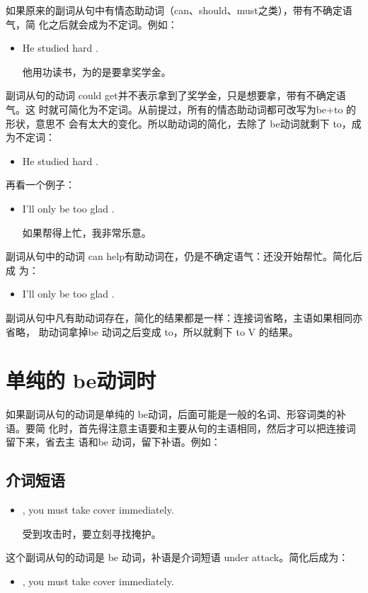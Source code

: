 如果原来的副词从句中有情态助动词（can、should、must之类），带有不确定语气，简
化之后就会成为不定词。例如：
\begin{itemize}
\item He studied hard .

  他用功读书，为的是要拿奖学金。
\end{itemize}
副词从句的动词 could get并不表示拿到了奖学金，只是想要拿，带有不确定语气。这
时就可简化为不定词。从前提过，所有的情态助动词都可改写为be+to 的形状，意思不
会有太大的变化。所以助动词的简化，去除了 be动词就剩下 to，成为不定词：
\begin{itemize}
\item He studied hard .
\end{itemize}

再看一个例子：
\begin{itemize}
\item I'll only be too glad .

  如果帮得上忙，我非常乐意。
\end{itemize}
副词从句中的动词 can help有助动词在，仍是不确定语气：还没开始帮忙。简化后成
为：
\begin{itemize}
\item   I'll only be too glad .
\end{itemize}

副词从句中凡有助动词存在，简化的结果都是一样：连接词省略，主语如果相同亦省略，
助动词拿掉be 动词之后变成 to，所以就剩下 to V 的结果。

\section{单纯的 be动词时}

如果副词从句的动词是单纯的 be动词，后面可能是一般的名词、形容词类的补语。要简
化时，首先得注意主语要和主要从句的主语相同，然后才可以把连接词留下来，省去主
语和be 动词，留下补语。例如：

\subsection{介词短语}

\begin{itemize}
\item {}, you must take cover immediately.

  受到攻击时，要立刻寻找掩护。
\end{itemize}
这个副词从句的动词是 be 动词，补语是介词短语 under attack。简化后成为：
\begin{itemize}
\item {}, you must take cover immediately.
\end{itemize}

